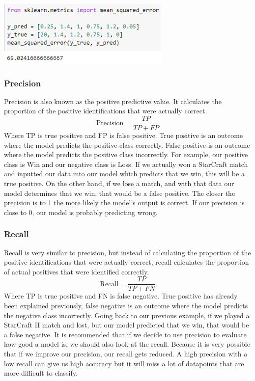 \documentclass[a4paper,12pt]{report}
\begin{document}
\begin{center}
    \captionsetup{type=figure}
    \includegraphics[width=.6\linewidth]{media/MSEcode2.png}
\end{center}
 
\subsubsection{Precision}

Precision is also known as the positive predictive value. It calculates the proportion of the positive identifications that were actually correct.
$$\text{Precision}=\frac{TP}{TP+FP}$$
Where TP  is true positive and FP is false positive. True positive is an outcome where the model predicts the positive class correctly. False positive is an outcome where the model predicts the positive class incorrectly. For example, our positive class is Win and our negative class is Loss. If we actually won a StarCraft match and inputted our data into our model which predicts that we win, this will be a true positive. On the other hand, if we lose a match, and with that data our model determines that we win, that would be a false positive. The closer the precision is to 1 the more likely the model’s output is correct. If our precision is close to 0, our model is probably predicting wrong.
 
\subsubsection{Recall}

Recall is very similar to precision, but instead of calculating the proportion of the positive identifications that were actually correct, recall calculates the proportion of actual positives that were identified correctly.
$$\text{Recall}=\frac{TP}{TP+FN}$$
Where TP is true positive and FN is false negative. True positive has already been explained previously, false negative is an outcome where the model predicts the negative class incorrectly. Going back to our previous example, if we played a StarCraft II match and lost, but our model predicted that we win, that would be a false negative. It is recommended that if we decide to use precision to evaluate how good a model is, we should also look at the recall. Because it is very possible that if we improve our precision, our recall gets reduced. A high precision with a low recall can give us high accuracy but it will miss a lot of datapoints that are more difficult to classify.
 
\end{document}

